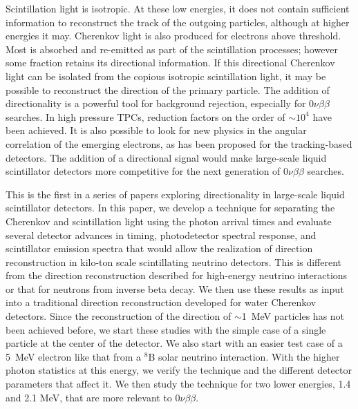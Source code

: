 \documentclass[cits]{JINST}
\begin{document}
Scintillation light is isotropic. At these low energies, it does not contain sufficient information to reconstruct the track of the outgoing particles, although at higher energies it may\cite{john}.  Cherenkov light is also
produced for electrons above threshold. Most is absorbed and re-emitted as part of the
scintillation processes; however some fraction retains its
directional information. If this directional Cherenkov light can be
isolated from the copious isotropic scintillation light, it may be
possible to reconstruct the direction of the primary particle. The addition of directionality is a powerful tool
for background rejection, especially for $0\nu\beta\beta$ searches. In high pressure TPCs, reduction factors on the order of $\sim10^4$ have been achieved\cite{Gotthard}. It is also possible to look for new physics in the angular correlation of the emerging electrons\cite{newphysics0nuBB}, as has been proposed for the tracking-based detectors\cite{SuperNEMO,NEXTsipm}. The addition of a directional signal would make large-scale liquid scintillator detectors more competitive for the next generation of $0\nu\beta\beta$ searches. 

This is the first in a series of papers exploring directionality in large-scale liquid scintillator detectors. In this paper, we develop a technique for
separating the Cherenkov and scintillation light using the photon arrival
times and evaluate several detector advances in timing, photodetector 
spectral response, and scintillator emission spectra that would allow
the realization of direction reconstruction in kilo-ton scale
scintillating neutrino detectors. This is different from the direction reconstruction described for high-energy neutrino interactions\cite{john} or that for neutrons from inverse beta decay\cite{chooz,dcDirection}.  We then use these results as input into a traditional direction reconstruction developed for water Cherenkov detectors. Since the reconstruction of the direction of $\sim$1~MeV particles has not been achieved before, we start these studies with the %
simple case of a single particle at the center of the detector. We also start with an easier test case of a 5~MeV electron like that from a $^{8}$B solar neutrino interaction. With the higher photon statistics at this energy, we verify the technique and the different detector parameters that affect it. We then study the technique for two lower energies, 1.4 and 2.1 MeV, that are more relevant to $0\nu\beta\beta$.  
\end{document}
